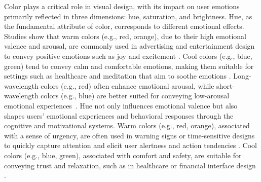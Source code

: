Color plays a critical role in visual design, with its impact on user emotions primarily reflected in three dimensions: hue, saturation, and brightness. Hue, as the fundamental attribute of color, corresponds to different emotional effects. Studies show that warm colors (e.g., red, orange), due to their high emotional valence and arousal, are commonly used in advertising and entertainment design to convey positive emotions such as joy and excitement \cite{jonauskaite2019color, kallabis2024investigating}. Cool colors (e.g., blue, green) tend to convey calm and comfortable emotions, making them suitable for settings such as healthcare and meditation that aim to soothe emotions \cite{ wilms2018color}. Long-wavelength colors (e.g., red) often enhance emotional arousal, while short-wavelength colors (e.g., blue) are better suited for conveying low-arousal emotional experiences~\cite{wilms2018color}.
Hue not only influences emotional valence but also shapes users’ emotional experiences and behavioral responses through the cognitive and motivational systems. Warm colors (e.g., red, orange), associated with a sense of urgency, are often used in warning signs or time-sensitive designs to quickly capture attention and elicit user alertness and action tendencies \cite{zajonc1980feeling, phelps1998specifying}. Cool colors (e.g., blue, green), associated with comfort and safety, are suitable for conveying trust and relaxation, such as in healthcare or financial interface design \cite{phelps1998specifying}. %

